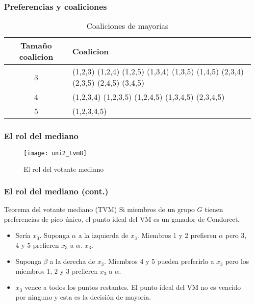 \documentclass[14pt,aspectratio=169]{beamer}
\begin{document}
\begin{frame}\frametitle{Preferencias y coaliciones}
  \begin{table}[htbp]
    \centering
    \begin{tabular}[htbp]{|c|p{5cm}|} \hline
      Tamaño coalicion & Coalicion \\ \hline
3 & (1,2,3) (1,2,4) (1,2,5) (1,3,4) (1,3,5) (1,4,5) (2,3,4) (2,3,5)
    (2,4,5) (3,4,5) \\\hline
4 & (1,2,3,4) (1,2,3,5) (1,2,4,5) (1,3,4,5) (2,3,4,5) \\\hline
5 & (1,2,3,4,5) \\\hline
    \end{tabular}
    \caption{Coaliciones de mayorias}
    \label{tab:1}
  \end{table}
\end{frame}


\begin{frame}\frametitle{El rol del mediano}
\begin{figure}[htbp]
    \centering
    \texttt{[image: uni2\_tvm8]}
    \caption{El rol del votante mediano}
    \label{fig:1}
  \end{figure}
\end{frame}

\begin{frame}\frametitle{El rol del mediano (cont.)}
\begin{block}{Teorema del votante mediano (TVM)}
Si miembros de un grupo $G$ tienen preferencias de pico único, el punto ideal del VM es un ganador de Condorcet.
\end{block}
\begin{itemize}\itemsep 10pt
\item Sería $x_3$. Suponga $\alpha$ a
  la izquierda de $x_3$. Miembros 1 y 2 prefieren $\alpha$ pero 3,
  4 y 5 prefieren $x_3$ a $\alpha$.
  $x_3$.
\item Suponga $\beta$ a la derecha de $x_3$. Miembros 4 y 5 pueden preferirlo a $x_3$ pero los miembros 1, 2 y 3
  prefieren $x_3$ a $\alpha$.
\item $x_3$ vence a todos los puntos restantes. El punto ideal del
  VM no es vencido por ninguno y esta es la decisión de mayoría.
\end{itemize}
\end{frame}
\end{document}
